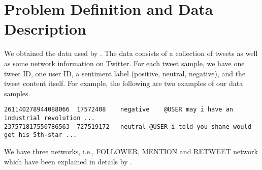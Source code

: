 
\section{Problem Definition and Data Description}
\label{Sec:ProblemData}


We obtained the data used by \cite{yang2017attention}. The data consists of a collection of tweets as well as some network information on Twitter. For each tweet sample, we have one tweet ID, one user ID, a sentiment label (positive, neutral, negative), and the tweet content itself. For example, the following are two examples of our data samples.
\begin{verbatim}
261140278944088066	17572408	negative	@USER may i have an industrial revolution ...
237571817550786563	727519172	neutral	@USER i told you shane would get his 5th-star ...
\end{verbatim}
We have three networks, i.e., FOLLOWER, MENTION and RETWEET network which have been explained in details by
\cite{yang2017attention}.
